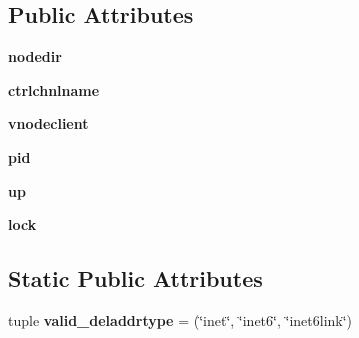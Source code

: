 \subsection*{Public Attributes}
\begin{DoxyCompactItemize}
\item 
\hypertarget{classcore_1_1netns_1_1vnode_1_1_simple_lxc_node_aa40baa94649ecc3d99e4d3e606245fc6}{{\bfseries nodedir}}\label{classcore_1_1netns_1_1vnode_1_1_simple_lxc_node_aa40baa94649ecc3d99e4d3e606245fc6}

\item 
\hypertarget{classcore_1_1netns_1_1vnode_1_1_simple_lxc_node_aa4a26311109f6c556beb1b1afe3b7df0}{{\bfseries ctrlchnlname}}\label{classcore_1_1netns_1_1vnode_1_1_simple_lxc_node_aa4a26311109f6c556beb1b1afe3b7df0}

\item 
\hypertarget{classcore_1_1netns_1_1vnode_1_1_simple_lxc_node_a57bdec6b80d2c66516fbc97bc2f533d2}{{\bfseries vnodeclient}}\label{classcore_1_1netns_1_1vnode_1_1_simple_lxc_node_a57bdec6b80d2c66516fbc97bc2f533d2}

\item 
\hypertarget{classcore_1_1netns_1_1vnode_1_1_simple_lxc_node_a59790f2683048cfa91113f397bc95f76}{{\bfseries pid}}\label{classcore_1_1netns_1_1vnode_1_1_simple_lxc_node_a59790f2683048cfa91113f397bc95f76}

\item 
\hypertarget{classcore_1_1netns_1_1vnode_1_1_simple_lxc_node_a91f1ced8bb169b8ec41aec026bcee312}{{\bfseries up}}\label{classcore_1_1netns_1_1vnode_1_1_simple_lxc_node_a91f1ced8bb169b8ec41aec026bcee312}

\item 
\hypertarget{classcore_1_1netns_1_1vnode_1_1_simple_lxc_node_a2aa38fc1c79289c66fdd02016bd04311}{{\bfseries lock}}\label{classcore_1_1netns_1_1vnode_1_1_simple_lxc_node_a2aa38fc1c79289c66fdd02016bd04311}

\end{DoxyCompactItemize}
\subsection*{Static Public Attributes}
\begin{DoxyCompactItemize}
\item 
\hypertarget{classcore_1_1netns_1_1vnode_1_1_simple_lxc_node_a918941295b28b15f4cf854608603f32b}{tuple {\bfseries valid\+\_\+deladdrtype} = (\char`\"{}inet\char`\"{}, \char`\"{}inet6\char`\"{}, \char`\"{}inet6link\char`\"{})}\label{classcore_1_1netns_1_1vnode_1_1_simple_lxc_node_a918941295b28b15f4cf854608603f32b}

\end{DoxyCompactItemize}


